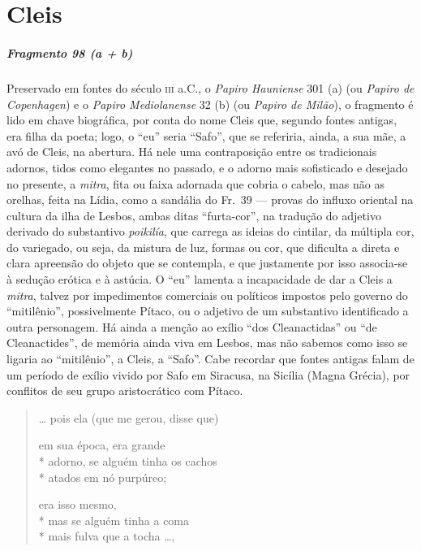 {\chapter{Cleis}


\paragraph{Fragmento 98 (a + b)}

{\small Preservado em fontes do século \textsc{iii} a.C., o \textit{Papiro Hauniense }301 (a) (ou
\textit{Papiro de Copenhagen}) e o \textit{Papiro Mediolanense }32 (b) (ou
\textit{Papiro de Milão}), o fragmento é lido em chave biográfica, por conta do
nome Cleis que, segundo fontes antigas, era filha da poeta; logo, o “eu” seria
``Safo”, que se referiria, ainda, a sua mãe, a avó de Cleis, na
abertura. Há nele uma contraposição entre os tradicionais adornos, tidos como		\EP[]
elegantes no passado, e o adorno mais sofisticado e desejado no presente, a
\textit{mitra}, fita ou faixa adornada que cobria o cabelo, mas não as orelhas,
feita na Lídia, como a sandália do Fr.~39 --- provas do influxo oriental na
cultura da ilha de Lesbos, ambas ditas ``furta-cor”, na tradução do
adjetivo derivado do substantivo \textit{poikilía}, que carrega as ideias do
cintilar, da múltipla cor, do variegado, ou seja, da mistura de luz, formas ou
cor, que dificulta a direta e clara apreensão do objeto que se contempla, e que
justamente por isso associa-se à sedução erótica e à astúcia. O “eu” lamenta a
incapacidade de dar a Cleis a \textit{mitra}, talvez por impedimentos
comerciais ou políticos impostos pelo governo do “mitilênio”, possivelmente
Pítaco, ou o adjetivo de um substantivo identificado a outra personagem. Há
ainda a menção ao exílio “dos Cleanactidas” ou “de Cleanactides”, de memória
ainda viva em Lesbos, mas não sabemos como isso se ligaria ao
“mitilênio”, a Cleis, a ``Safo”. Cabe recordar que fontes antigas falam
de um período de exílio vivido por Safo em Siracusa, na Sicília (Magna Grécia),
por conflitos de seu grupo aristocrático com Pítaco.}

\begin{verse}
\ldots{} pois ela (que me gerou, disse que)


em sua época, era grande \\*
adorno, se alguém tinha os cachos\\*
atados em nó purpúreo;


era isso mesmo, \\*
mas se alguém tinha a coma\\*
mais fulva que a tocha \ldots{},


\end{verse}}
